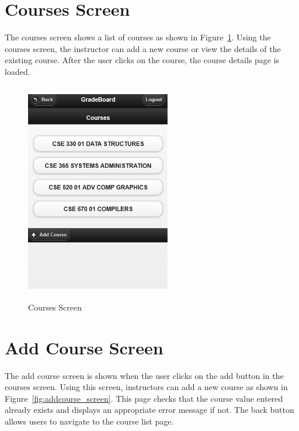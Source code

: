 \newpage
\section{Courses Screen}
The courses screen shows a list of courses as shown in Figure~\ref{fig:courses_screen}. Using the courses screen, the instructor can add a new course or view the details of the existing course. After the user clicks on the course, the course details page is loaded.

\vspace{3em}
\begin{figure}[H]
\begin{center}
\includegraphics[height=3.8in,width=2.5in]{images/courses_screen.jpg}
\caption{Courses Screen}
\label{fig:courses_screen}
\end{center}
\end{figure}

\newpage
\section{Add Course Screen}
The add course screen is shown when the user clicks on the add button in the courses screen. Using this screen, instructors can add a new course as shown in Figure~\ref{fig:addcourse_screen}. This page checks that the course value entered already exists and displays an appropriate error message if not. The back button allows users to navigate to the course list page.


